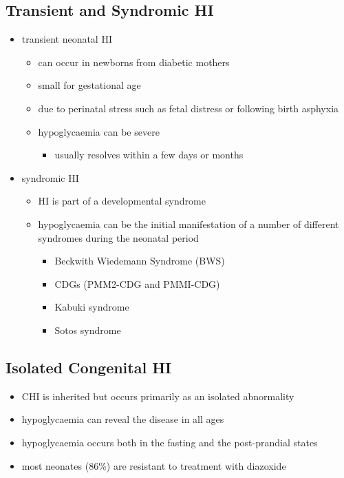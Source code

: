 \documentclass{scrartcl}
\begin{document}
\subsection{Transient and Syndromic HI}
\label{sec:org8ba1e2f}
\begin{itemize}
\item transient neonatal HI
\begin{itemize}
\item can occur in newborns from diabetic mothers
\item small for gestational age
\item due to perinatal stress such as fetal distress or following birth asphyxia
\item hypoglycaemia can be severe
\begin{itemize}
\item usually resolves within a few days or months
\end{itemize}
\end{itemize}
\item syndromic HI
\begin{itemize}
\item HI is part of a developmental syndrome
\item hypoglycaemia can be the initial manifestation of a number of
different syndromes during the neonatal period
\begin{itemize}
\item Beckwith Wiedemann Syndrome (BWS)
\item CDGs (PMM2-CDG and PMMI-CDG)
\item Kabuki syndrome
\item Sotos syndrome
\end{itemize}
\end{itemize}
\end{itemize}

\subsection{Isolated Congenital HI}
\label{sec:org2af67fc}
\begin{itemize}
\item CHI is inherited but occurs primarily as an isolated abnormality
\item hypoglycaemia can reveal the disease in all ages
\item hypoglycaemia occurs both in the fasting and the post-prandial states
\item most neonates (86\%) are resistant to treatment with diazoxide
\end{itemize}
\end{document}
